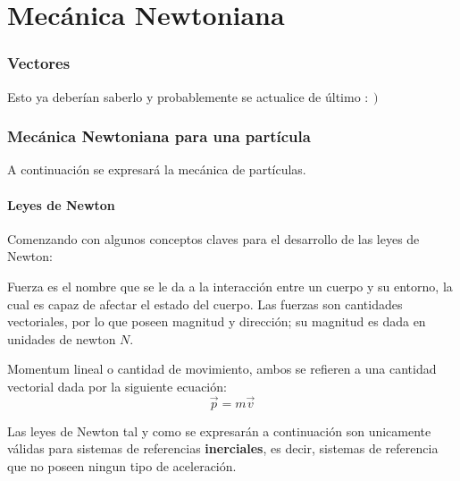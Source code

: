 \documentclass[/home/hernan/Documentos/Apuntes_mecanica_teorica/main.tex]{subfiles}
\begin{document}
	\part{Mecánica Newtoniana} 
	\label{prt:Mecánica Newtoniana}

	\section{Vectores}\label{sec:vectores}


	Esto ya deberían saberlo y probablemente se actualice de último $: \left . \right)$

	\newpage
	\section{Mecánica Newtoniana para una partícula}\label{sec: N.particula }

	A continuación se expresará la mecánica de partículas.

	\subsection{Leyes de Newton}
	
	Comenzando con algunos conceptos claves para el desarrollo de las leyes de Newton:

	\begin{definition}
		Fuerza es el nombre que se le da a la interacción entre un cuerpo y su entorno, la cual es capaz de afectar el estado del cuerpo. Las fuerzas son cantidades vectoriales, por lo que poseen magnitud y dirección; su magnitud es dada en unidades de newton $N$.
	\end{definition}

	\begin{definition}
		Momentum lineal o cantidad de movimiento, ambos se refieren a una cantidad vectorial dada por la siguiente ecuación:
		\begin{equation}
			\vec{p} = m \vec{v}
			\label{eq: momentuml}
		\end{equation}
	\end{definition}

	Las leyes de Newton tal y como se expresarán a continuación son unicamente válidas para sistemas de referencias \textbf{inerciales}, es decir, sistemas de referencia que no poseen ningun tipo de aceleración.


\end{document}
